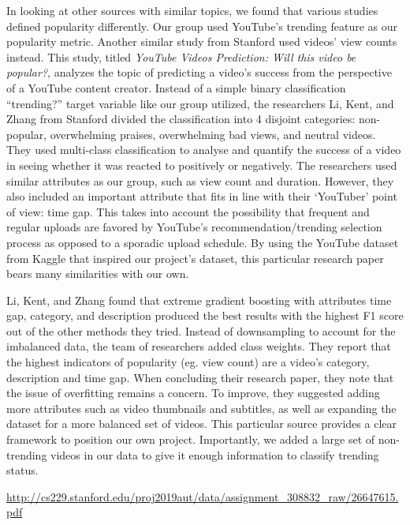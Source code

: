 \documentclass{article}
\begin{document}
\par In looking at other sources with similar topics, we found that various studies defined popularity differently. Our group used YouTube’s trending feature as our popularity metric. Another similar study from Stanford used videos’ view counts instead. This study, titled \textit{YouTube Videos Prediction: Will this video be popular?}, analyzes the topic of predicting a video’s success from the perspective of a YouTube content creator. Instead of a simple binary classification “trending?” target variable like our group utilized, the researchers Li, Kent, and Zhang from Stanford divided the classification into 4 disjoint categories: non-popular, overwhelming praises, overwhelming bad views, and neutral videos. They used multi-class classification to analyse and quantify the success of a video in seeing whether it was reacted to positively or negatively. The researchers used similar attributes as our group, such as view count and duration. However, they also included an important attribute that fits in line with their ‘YouTuber’ point of view: time gap. This takes into account the possibility that frequent and regular uploads are favored by YouTube’s recommendation/trending selection process as opposed to a sporadic upload schedule. By using the YouTube dataset from Kaggle that inspired our project’s dataset, this particular research paper bears many similarities with our own.
\par Li, Kent, and Zhang found that extreme gradient boosting with attributes {time gap, category, and description} produced the best results with the highest F1 score out of the other methods they tried. Instead of downsampling to account for the imbalanced data, the team of researchers added class weights. They report that the highest indicators of popularity (eg. view count) are a video’s category, description and time gap. When concluding their research paper, they note that the issue of overfitting remains a concern. To improve, they suggested adding more attributes such as video thumbnails and subtitles, as well as expanding the dataset for a more balanced set of videos. This particular source provides a clear framework to position our own project. Importantly, we added a large set of non-trending videos in our data to give it enough information to classify trending status. \medskip

\href{http://cs229.stanford.edu/proj2019aut/data/assignment_308832_raw/26647615.pdf}{http://cs229.stanford.edu/proj2019aut/data/assignment_308832_raw/26647615.pdf}
\end{document}

